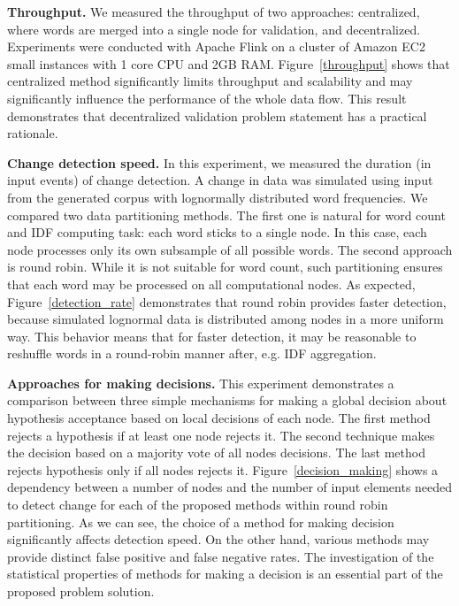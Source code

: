 {\bf Throughput.} We measured the throughput of two approaches: centralized, where words are merged into a single node for validation, and decentralized. Experiments were conducted with Apache Flink on a cluster of Amazon EC2 small instances with 1 core CPU and 2GB RAM. Figure~\ref{throughput} shows that centralized method significantly limits throughput and scalability and may significantly influence the performance of the whole data flow. This result demonstrates that decentralized validation problem statement has a practical rationale.

{\bf Change detection speed.} In this experiment, we measured the duration (in input events) of change detection. A change in data was simulated using input from the generated corpus with lognormally distributed word frequencies. We compared two data partitioning methods. The first one is natural for word count and IDF computing task: each word sticks to a single node. In this case, each node processes only its own subsample of all possible words. The second approach is round robin. While it is not suitable for word count, such partitioning ensures that each word may be processed on all computational nodes. As expected, Figure~\ref{detection_rate} demonstrates that round robin provides faster detection, because simulated lognormal data is distributed among nodes in a more uniform way. This behavior means that for faster detection, it may be reasonable to reshuffle words in a round-robin manner after, e.g. IDF aggregation.

{\bf Approaches for making decisions.} This experiment demonstrates a comparison between three simple mechanisms for making a global decision about hypothesis acceptance based on local decisions of each node. The first method rejects a hypothesis if at least one node rejects it. The second technique makes the decision based on a majority vote of all nodes decisions. The last method rejects hypothesis only if all nodes rejects it. Figure~\ref{decision_making} shows a dependency between a number of nodes and the number of input elements needed to detect change for each of the proposed methods within round robin partitioning. As we can see, the choice of a method for making decision significantly affects detection speed. On the other hand, various methods may provide distinct false positive and false negative rates. The investigation of the statistical properties of methods for making a decision is an essential part of the proposed problem solution.